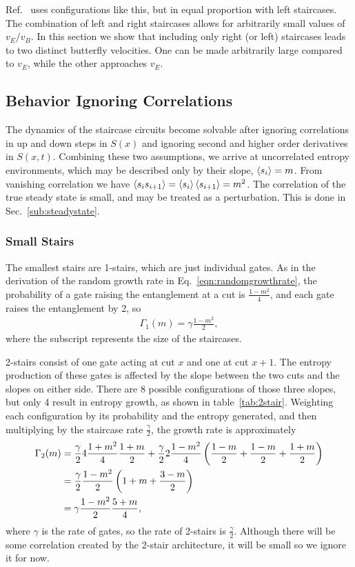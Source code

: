 Ref.~\cite{Nahum2018} uses configurations like this, but in equal proportion with left staircases. The combination of left and right staircases allows for arbitrarily small values of $v_E/v_B$. In this section we show that including only right (or left) staircases leads to two distinct butterfly velocities. One can be made arbitrarily large compared to $v_E$, while the other approaches $v_E$.

\subsection{Behavior Ignoring Correlations} \label{sub:anal}

The dynamics of the staircase circuits become solvable after ignoring correlations in up and down steps in $S(x)$ and ignoring second and higher order derivatives in $S(x,t)$. Combining these two assumptions, we arrive at uncorrelated entropy environments, which may be described only by their slope, $\left\langle s_i \right\rangle = m$. From vanishing correlation we have $\left\langle s_is_{i+1} \right\rangle = \left\langle s_i \right\rangle\left\langle s_{i+1} \right\rangle = m^2$. The correlation of the true steady state is small, and may be treated as a perturbation. This is done in Sec.~\ref{sub:steadystate}.

\subsubsection{Small Stairs} \label{subsub:smallstairs} 

The smallest stairs are 1-stairs, which are just individual gates. As in the derivation of the random growth rate in Eq.~\ref{eqn:randomgrowthrate}, the probability of a gate raising the entanglement at a cut is $\frac{1-m^2}{4}$, and each gate raises the entanglement by 2, so 
\begin{align}
\Gamma_1(m) = \gamma\frac{1-m^2}{2},
\end{align}
where the subscript represents the size of the staircases.

2-stairs consist of one gate acting at cut $x$ and one at cut $x+1$. The entropy production of these gates is affected by the slope between the two cuts and the slopes on either side. There are 8 possible configurations of those three slopes, but only 4 result in entropy growth, as shown in table~\ref{tab:2stair}. Weighting each configuration by its probability and the entropy generated, and then multiplying by the staircase rate $\frac{\gamma}{2}$, the growth rate is approximately
\begin{align}
\Gamma_2(m) &= \frac{\gamma}{2} 4\frac{1+m^2}{4}\frac{1+m}{2} + \frac{\gamma}{2}
	2\frac{1-m^2}{4}
	\left(\frac{1-m}{2} + \frac{1-m}{2} + \frac{1+m}{2}\right) \nonumber\\
&= \frac{\gamma}{2}\frac{1-m^2}{2}\left(1+m + \frac{3-m}{2}\right)\nonumber\\
&= \gamma\frac{1-m^2}{2}\frac{5+m}{4}, \label{eqn:2rate}
\end{align}
where $\gamma$ is the rate of gates, so the rate of 2-stairs is $\frac{\gamma}{2}$. Although there will be some correlation created by the 2-stair architecture, it will be small so we ignore it for now. 

